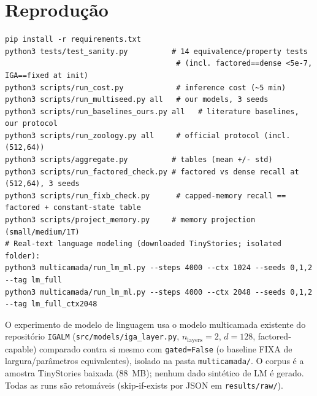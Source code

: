 \documentclass[11pt]{article}
\begin{document}

\section{Reprodu\c{c}\~ao}

\begin{verbatim}
pip install -r requirements.txt
python3 tests/test_sanity.py          # 14 equivalence/property tests
                                       # (incl. factored==dense <5e-7, IGA==fixed at init)
python3 scripts/run_cost.py            # inference cost (~5 min)
python3 scripts/run_multiseed.py all   # our models, 3 seeds
python3 scripts/run_baselines_ours.py all   # literature baselines, our protocol
python3 scripts/run_zoology.py all     # official protocol (incl. (512,64))
python3 scripts/aggregate.py          # tables (mean +/- std)
python3 scripts/run_factored_check.py # factored vs dense recall at (512,64), 3 seeds
python3 scripts/run_fixb_check.py      # capped-memory recall == factored + constant-state table
python3 scripts/project_memory.py     # memory projection (small/medium/1T)
# Real-text language modeling (downloaded TinyStories; isolated folder):
python3 multicamada/run_lm_ml.py --steps 4000 --ctx 1024 --seeds 0,1,2 --tag lm_full
python3 multicamada/run_lm_ml.py --steps 4000 --ctx 2048 --seeds 0,1,2 --tag lm_full_ctx2048
\end{verbatim}

O experimento de modelo de linguagem usa o modelo multicamada existente do
reposit\'orio \texttt{IGALM} (\texttt{src/models/iga\_layer.py},
$n_{\mathrm{layers}}{=}2$, $d=128$, factored-capable) comparado contra si mesmo
com \texttt{gated=False} (o baseline FIXA de largura/par\^ametros equivalentes),
isolado na pasta \texttt{multicamada/}. O corpus \'e a amostra TinyStories
baixada (88~MB); nenhum dado sint\'etico de LM \'e gerado. Todas as runs s\~ao
retom\'aveis (skip-if-exists por JSON em \texttt{results/raw/}).


\end{document}
